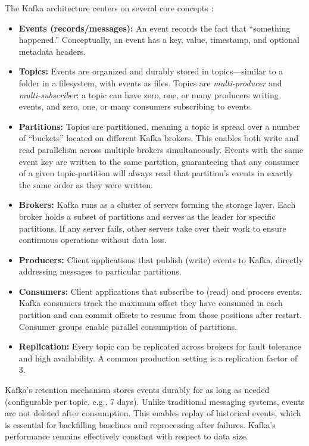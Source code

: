 The Kafka architecture centers on several core concepts \citep{kafkaintro2024}:

\begin{itemize}
    \item \textbf{Events (records/messages):} An event records the fact that ``something happened.'' Conceptually, an event has a key, value, timestamp, and optional metadata headers.
    \item \textbf{Topics:} Events are organized and durably stored in topics---similar to a folder in a filesystem, with events as files. Topics are \textit{multi-producer} and \textit{multi-subscriber}: a topic can have zero, one, or many producers writing events, and zero, one, or many consumers subscribing to events.
    \item \textbf{Partitions:} Topics are partitioned, meaning a topic is spread over a number of ``buckets'' located on different Kafka brokers. This enables both write and read parallelism across multiple brokers simultaneously. Events with the same event key are written to the same partition, guaranteeing that any consumer of a given topic-partition will always read that partition's events in exactly the same order as they were written.
    \item \textbf{Brokers:} Kafka runs as a cluster of servers forming the storage layer. Each broker holds a subset of partitions and serves as the leader for specific partitions. If any server fails, other servers take over their work to ensure continuous operations without data loss.
    \item \textbf{Producers:} Client applications that publish (write) events to Kafka, directly addressing messages to particular partitions.
    \item \textbf{Consumers:} Client applications that subscribe to (read) and process events. Kafka consumers track the maximum offset they have consumed in each partition and can commit offsets to resume from those positions after restart. Consumer groups enable parallel consumption of partitions.
    \item \textbf{Replication:} Every topic can be replicated across brokers for fault tolerance and high availability. A common production setting is a replication factor of 3.
\end{itemize}

Kafka's retention mechanism stores events durably for as long as needed (configurable per topic, e.g., 7 days). Unlike traditional messaging systems, events are not deleted after consumption. This enables replay of historical events, which is essential for backfilling baselines and reprocessing after failures. Kafka's performance remains effectively constant with respect to data size.

